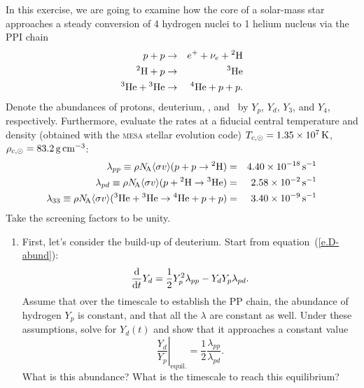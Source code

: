 \newpage
\begin{exercisebox}
In this exercise, we are going to examine how the core of a solar-mass star approaches a steady conversion of 4 hydrogen nuclei to 1 helium nucleus via the PPI chain
\begin{eqnarray*}
 \pt + \pt &\to& e^{+} + \nu_{e} + \hydrogen[2]\\
 \hydrogen[2] + \pt &\to& \helium[3]\\
 \helium[3] + \helium[3] &\to& \helium + \pt + \pt.
 \end{eqnarray*}
Denote the abundances of protons, deuterium, \helium[3], and \helium\ by $Y_{p}$, $Y_{d}$, $Y_{3}$, and $Y_{4}$, respectively.  Furthermore, evaluate the rates at a fiducial central temperature and density (obtained with the \textsc{mesa} stellar evolution code) $T_{c,\odot} = 1.35\ee{7}\nsp\K$, $\rho_{c,\odot} = 83.2\nsp\grampercc$:
\begin{eqnarray*}
\lambda_{pp} \equiv \rho\NA\langle\sigma v\rangle(\pt+\pt \to \hydrogen[2]) &=& 4.40\ee{-18}\nsp\second^{-1} \\
\lambda_{pd} \equiv \rho\NA\langle\sigma v\rangle(\pt+\hydrogen[2] \to \helium[3])&=& 2.58\ee{-2}\nsp\second^{-1}\\
\lambda_{33} \equiv \rho\NA\langle\sigma v\rangle(\helium[3]+\helium[3]\to\helium[4]+\pt+\pt) &=& 3.40\ee{-9}\nsp\second^{-1}
\end{eqnarray*}
Take the screening factors to be unity.
\begin{enumerate}
\item First, let's consider the build-up of deuterium. Start from equation~(\ref{e.D-abund}):
\begin{equation}
\frac{\dif}{\dif t} Y_{d} = \frac{1}{2}Y_{p}^{2}\lambda_{pp} - Y_{d}Y_{p}\lambda_{pd}.
\end{equation}
Assume that over the timescale to establish the PP chain, the abundance of hydrogen $Y_{p}$ is constant, and that all the $\lambda$ are constant as well. Under these assumptions, solve for $Y_{d}(t)$ and show that it approaches a constant value
\[ \left.\frac{Y_{d}}{Y_{p}}\right|_{\mathrm{equil.}} = \frac{1}{2}\frac{\lambda_{pp}}{\lambda_{pd}}. \]
What is this abundance? What is the timescale to reach this equilibrium?


\end{enumerate}
\end{exercisebox}
